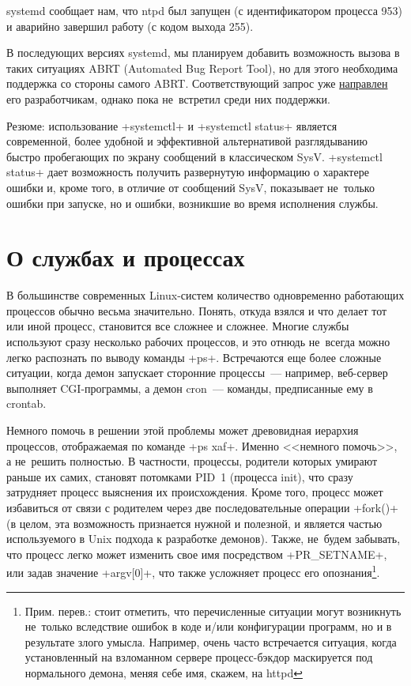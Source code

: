 \documentclass[10pt,oneside,a4paper]{article}
\begin{document}
systemd сообщает нам, что ntpd был запущен (с идентификатором процесса 953) и
аварийно завершил работу (с кодом выхода 255).

В последующих версиях systemd, мы планируем добавить возможность вызова в
таких ситуациях ABRT (Automated Bug Report Tool), но для этого необходима
поддержка со стороны самого ABRT. Соответствующий запрос уже
\href{https://bugzilla.redhat.com/show_bug.cgi?id=622773}{направлен} его
разработчикам, однако пока не~встретил среди них поддержки.

Резюме: использование +systemctl+ и +systemctl status+ является современной,
более удобной и эффективной альтернативой разглядыванию быстро пробегающих по
экрану сообщений в классическом SysV. +systemctl status+ дает возможность
получить развернутую информацию о характере ошибки и, кроме того, в отличие
от сообщений SysV, показывает не~только ошибки при запуске, но и ошибки,
возникшие во время исполнения службы. 

\section{О службах и процессах}
В большинстве современных Linux-систем количество одновременно работающих
процессов обычно весьма значительно. Понять, откуда взялся и что делает тот
или иной процесс, становится все сложнее и сложнее. Многие службы используют
сразу несколько рабочих процессов, и это отнюдь не~всегда можно легко
распознать по выводу команды +ps+. Встречаются еще более сложные ситуации,
когда демон запускает сторонние процессы~--- например, веб-сервер выполняет
CGI-программы, а демон cron~--- команды, предписанные ему в crontab.

Немного помочь в решении этой проблемы может древовидная иерархия процессов,
отображаемая по команде +ps xaf+. Именно <<немного помочь>>, а не~решить
полностью. В частности, процессы, родители которых умирают раньше их самих,
становят потомками PID~1 (процесса init), что сразу затрудняет процесс
выяснения их происхождения. Кроме того, процесс может избавиться от связи с
родителем через две последовательные операции +fork()+ (в целом, эта возможность
признается нужной и полезной, и является частью используемого в Unix подхода
к разработке демонов). Также, не~будем забывать, что процесс легко может
изменить свое имя посредством +PR_SETNAME+, или задав значение
+argv[0]+, что также усложняет процесс его опознания\footnote{Прим.
перев.: стоит отметить, что перечисленные ситуации могут возникнуть не~только
вследствие ошибок в коде и/или конфигурации программ, но и в результате злого
умысла. Например, очень часто встречается ситуация, когда установленный на
взломанном сервере процесс-бэкдор маскируется под нормального демона, меняя
себе имя, скажем, на httpd}.
\end{document}
